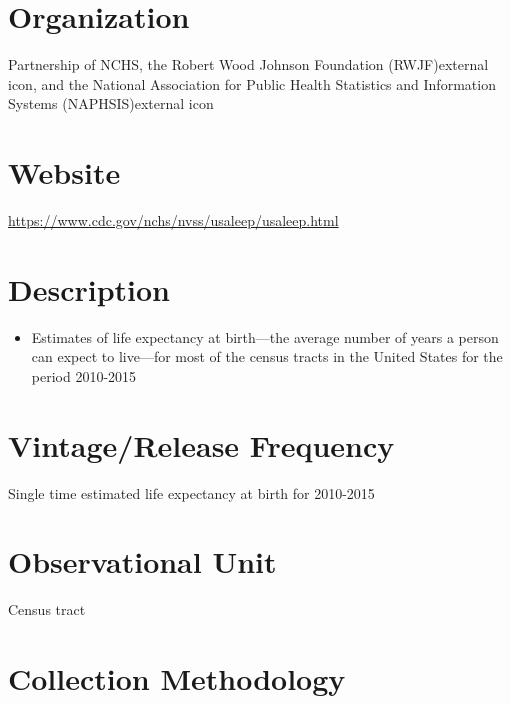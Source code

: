 \documentclass[
]{book}
\providecommand{\tightlist}{%
  \setlength{\itemsep}{0pt}\setlength{\parskip}{0pt}}
\begin{document}
\hypertarget{organization-96}{%
\section{Organization}\label{organization-96}}

Partnership of NCHS, the Robert Wood Johnson Foundation (RWJF)external icon, and the National Association for Public Health Statistics and Information Systems (NAPHSIS)external icon

\hypertarget{website-96}{%
\section{Website}\label{website-96}}

\url{https://www.cdc.gov/nchs/nvss/usaleep/usaleep.html}

\hypertarget{description-96}{%
\section{Description}\label{description-96}}

\begin{itemize}
\tightlist
\item
  Estimates of life expectancy at birth---the average number of years a person can expect to live---for most of the census tracts in the United States for the period 2010-2015
\end{itemize}

\hypertarget{vintagerelease-frequency-96}{%
\section{Vintage/Release Frequency}\label{vintagerelease-frequency-96}}

Single time estimated life expectancy at birth for 2010-2015

\hypertarget{observational-unit-96}{%
\section{Observational Unit}\label{observational-unit-96}}

Census tract

\hypertarget{collection-methodology-96}{%
\section{Collection Methodology}\label{collection-methodology-96}}
\end{document}
